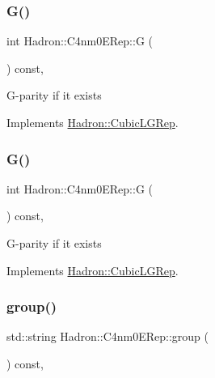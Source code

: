 \subsubsection{\texorpdfstring{G()}{G()}\hspace{0.1cm}{\footnotesize\ttfamily [2/3]}}
{\footnotesize\ttfamily int Hadron\+::\+C4nm0\+E\+Rep\+::G (\begin{DoxyParamCaption}{ }\end{DoxyParamCaption}) const\hspace{0.3cm}{\ttfamily [inline]}, {\ttfamily [virtual]}}

G-\/parity if it exists 

Implements \mbox{\hyperlink{structHadron_1_1CubicLGRep_ace26f7b2d55e3a668a14cb9026da5231}{Hadron\+::\+Cubic\+L\+G\+Rep}}.

\mbox{\label{structHadron_1_1C4nm0ERep_aeed131ece7b7c5203a64ac3591c75f59}} 
\subsubsection{\texorpdfstring{G()}{G()}\hspace{0.1cm}{\footnotesize\ttfamily [3/3]}}
{\footnotesize\ttfamily int Hadron\+::\+C4nm0\+E\+Rep\+::G (\begin{DoxyParamCaption}{ }\end{DoxyParamCaption}) const\hspace{0.3cm}{\ttfamily [inline]}, {\ttfamily [virtual]}}

G-\/parity if it exists 

Implements \mbox{\hyperlink{structHadron_1_1CubicLGRep_ace26f7b2d55e3a668a14cb9026da5231}{Hadron\+::\+Cubic\+L\+G\+Rep}}.

\mbox{\label{structHadron_1_1C4nm0ERep_a0d17268ef31fa011daabf7af62deec34}} 
\subsubsection{\texorpdfstring{group()}{group()}\hspace{0.1cm}{\footnotesize\ttfamily [1/3]}}
{\footnotesize\ttfamily std\+::string Hadron\+::\+C4nm0\+E\+Rep\+::group (\begin{DoxyParamCaption}{ }\end{DoxyParamCaption}) const\hspace{0.3cm}{\ttfamily [inline]}, {\ttfamily [virtual]}}

